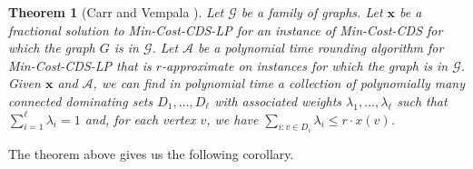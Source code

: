 \documentclass[11pt]{article}
\newtheorem{theorem}[lemma]{Theorem}
\def\script#1{\mathcal{#1}}
\def\sA{\script{A}}
\def\sG{\script{G}}
\def\prob#1{\textsf{\textup{#1}}\xspace}
\def\minCDSlp{\prob{\minCDS-LP}}
\def\minCDS{\prob{Min-Cost-CDS}}
\def\vx{\mathrm{\mathbf{x}}}
\begin{document}
\begin{theorem}[Carr and Vempala \cite{CarrV02}] \label{thm:convex-decomp}
	Let $\sG$ be a family of graphs. Let $\vx$ be a fractional
	solution to \minCDSlp for an instance of \minCDS for which the
	graph $G$ is in $\sG$. Let $\sA$ be a polynomial time rounding
	algorithm for \minCDSlp that is $r$-approximate on instances for
	which the graph is in $\sG$. Given $\vx$ and $\sA$, we can find
	in polynomial time a collection of polynomially many connected
	dominating sets $D_1, \dots, D_{\ell}$ with associated weights
	$\lambda_1, \dots, \lambda_{\ell}$ such that $\sum_{i = 1}^{\ell}
	\lambda_i = 1$ and, for each vertex $v$, we have $\sum_{i: v \in
	D_i} \lambda_i \leq r \cdotp x(v)$.
\end{theorem}

\noindent
The theorem above gives us the following corollary.
\end{document}
